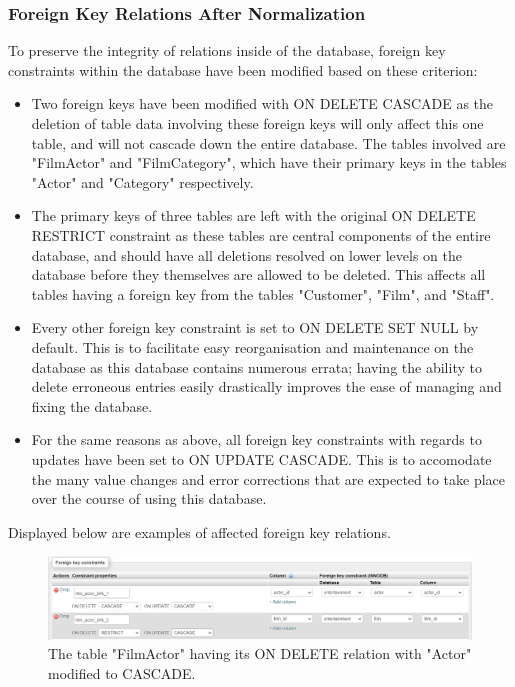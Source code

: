 \documentclass[openany]{article}
\begin{document}
	\subsubsection{Foreign Key Relations After Normalization}
		To preserve the integrity of relations inside of the database, foreign key constraints within the database have been modified based on these criterion:
		\begin{itemize}
			\item Two foreign keys have been modified with ON DELETE CASCADE as the deletion of table data involving these foreign keys will only affect this one table, and will not cascade down the entire database. The tables involved are "Film\textunderscore Actor" and "Film\textunderscore Category", which have their primary keys in the tables "Actor" and "Category" respectively. 
			\item The primary keys of three tables are left with the original ON DELETE RESTRICT constraint as these tables are central components of the entire database, and should have all deletions resolved on lower levels on the database before they themselves are allowed to be deleted. This affects all tables having a foreign key from the tables "Customer", "Film", and "Staff".
			\item Every other foreign key constraint is set to ON DELETE SET NULL by default. This is to facilitate easy reorganisation and maintenance on the database as this database contains numerous errata; having the ability to delete erroneous entries easily drastically improves the ease of managing and fixing the database.
			\item For the same reasons as above, all foreign key constraints with regards to updates have been set to ON UPDATE CASCADE. This is to accomodate the many value changes and error corrections that are expected to take place over the course of using this database. 
		\end{itemize}
		Displayed below are examples of affected foreign key relations.
		\begin{figure}[H]
			\includegraphics[width=\textwidth]{actor_cascade}
			\caption{The table "Film\textunderscore Actor" having its ON DELETE relation with "Actor" modified to CASCADE.}
		\end{figure}
\end{document}
